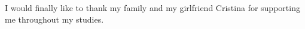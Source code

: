 \documentclass[10pt,a4paper]{report}
\begin{document}
I would finally like to thank my family and my 
girlfriend Cristina for supporting me throughout 
my studies.

\clearpage













\end{document}

